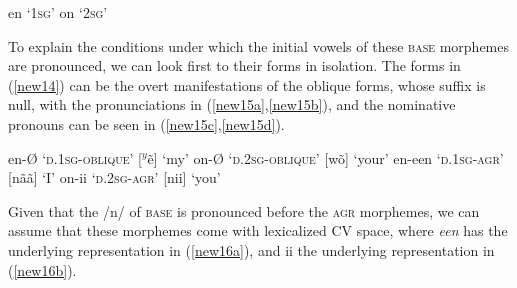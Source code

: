 \documentclass[output=paper,colorlinks,citecolor=brown,
]{langscibook}
\begin{document}
\begin{exe}
\ex \label{new14}
\begin{xlist}
\ex \label{new14a}
en	‘1\textsc{sg}’ 
\ex \label{new14b}
on	‘2\textsc{sg}’ 
\end{xlist}
\end{exe}

To explain the conditions under which the initial vowels of these \textsc{base} morphemes are pronounced, we can look first to their forms in isolation. The forms in (\ref{new14}) can be the overt manifestations of the oblique forms, whose suffix is null, with the pronunciations in (\ref{new15a},\ref{new15b}), and the nominative pronouns can be seen in (\ref{new15c},\ref{new15d}).

\begin{exe}
\ex \label{new15}
\begin{xlist}
\ex \label{new15a}
en-Ø 	\hspace{1cm}	‘\textsc{d}.1\textsc{sg-oblique}’	 \hspace{1.15cm}    	[$^{y}$ẽ]  \hspace{1cm}   	‘my’ 
\ex \label{new15b}
on-Ø 	\hspace{1cm}	‘\textsc{d}.2\textsc{sg-oblique}’	 \hspace{1cm}    	[wõ]   \hspace{0.95cm}    	‘your’ 
\ex \label{new15c}
en-een 	\hspace{0.7cm}    ‘\textsc{d}.1\textsc{sg-agr}’   \hspace{1.75cm} 		[nãã] \hspace{0.9cm}      	‘I’ 
\ex \label{new15d}
on-ii 	\hspace{1cm}	‘\textsc{d}.2\textsc{sg-agr}’      \hspace{1.75cm}    		[nii]   \hspace{1cm}     	‘you’ 
\end{xlist}
\end{exe}

Given that the /n/ of \textsc{base} is pronounced before the \textsc{agr} morphemes, we can assume that these morphemes come with lexicalized CV space, where \textit{een} has the underlying representation in (\ref{new16a}), and ii the underlying representation in (\ref{new16b}).
\end{document}
